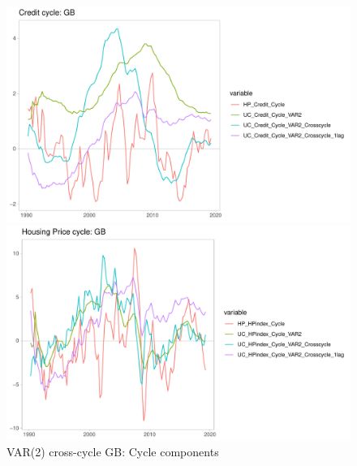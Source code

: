 \documentclass[fleqn]{article}
\begin{document}
\begin{outline}[enumerate]
		\begin{figure}[h!]
			\caption{VAR(2) cross-cycle GB: Cycle components}	
			\centerline{\includegraphics[scale=0.7]{../Graphs/Credit_cycle_GB.pdf}}
			\centerline{\includegraphics[scale=0.7]{../Graphs/HP_cycle_GB.pdf}}
		\end{figure}
		

\end{outline}
\end{document}
